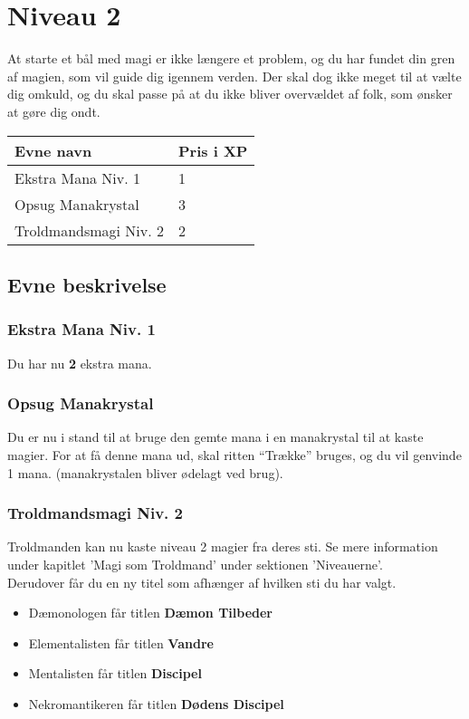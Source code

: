 \chapter*{Niveau 2}
At starte et bål med magi er ikke længere et problem, og du har fundet din gren af magien, som vil guide dig igennem verden. Der skal dog ikke meget til at vælte dig omkuld, og du skal passe på at du ikke bliver overvældet af folk, som ønsker at gøre dig ondt.

\begin{table}[H]
    \centering
    \begin{tabular}{|p{}|p{}|}
    \rowcolor{cerulean!80}\hline
    Evne navn & Pris i XP \\\hline
        Ekstra Mana Niv. 1 & 1 \\\hline
        Opsug Manakrystal & 3\\\hline
        Troldmandsmagi Niv. 2 & 2\\\hline
    \end{tabular}
\end{table}
\section*{Evne beskrivelse}

\subsection*{Ekstra Mana Niv. 1} 
Du har nu \textbf{2} ekstra mana.

\subsection*{Opsug Manakrystal}
Du er nu i stand til at bruge den gemte mana i en manakrystal til at kaste magier. For at få denne mana ud, skal ritten “Trække” bruges, og du vil genvinde 1 mana. (manakrystalen bliver ødelagt ved brug).

\subsection*{Troldmandsmagi Niv. 2}
Troldmanden kan nu kaste niveau 2 magier fra deres sti. Se mere information under kapitlet 'Magi som Troldmand' under sektionen 'Niveauerne'. \\
Derudover får du en ny titel som afhænger af hvilken sti du har valgt.\\
\begin{itemize}
    \item Dæmonologen får titlen \textbf{Dæmon Tilbeder}
    \item Elementalisten får titlen \textbf{Vandre}
    \item Mentalisten får titlen \textbf{Discipel}
    \item Nekromantikeren får titlen \textbf{Dødens Discipel}
\end{itemize}